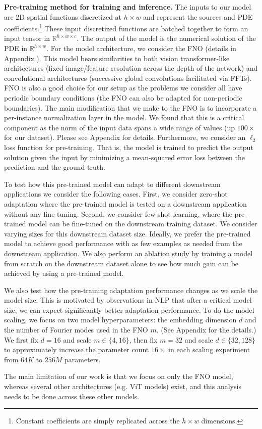 \medskip
\noindent \textbf{Pre-training method for training and inference.}
The inputs to our model are 2D spatial functions discretized at $h \times w$ and represent the sources and PDE coefficients.\footnote{Constant coefficients are simply replicated across the $h \times w$ dimensions.} 
These input discretized functions are batched together to form an input tensor in $\mathbb{R}^{h\times w\times c}$. The output of the model is the numerical solution of the PDE in $\mathbb{R}^{h\times w}$. 
%
For the model architecture, we consider the FNO (details in Appendix ). 
This model bears similarities to both vision transformer-like architectures (fixed image/feature resolution across the depth of the network) and convolutional architectures (successive global convolutions facilitated via FFTs).
FNO is also a good choice for our setup as the problems we consider all have periodic boundary conditions (the FNO can also be adapted for non-periodic boundaries). 
The main modification that we make to the FNO is to incorporate a per-instance normalization layer in the model. 
We found that this is a critical component as the norm of the input data spans a wide range of values (up $100\times$ for our dataset). 
Please see Appendix  for details.
%
Furthermore, we consider an $\ell_2$ loss function for pre-training. 
That is, the model is trained to predict the output solution given the input by minimizing a mean-squared error loss between the prediction and the ground truth.

To test how this pre-trained model can adapt to different downstream applications we consider the following cases. 
First,
we consider zero-shot adaptation where the pre-trained model is tested on a downstream application without any fine-tuning. 
Second, we consider few-shot learning, where the pre-trained model can be fine-tuned on the downstream training dataset. 
We consider varying sizes for this downstream dataset size. 
Ideally, we prefer the pre-trained model to achieve good performance with as few examples as needed from the downstream application. 
We also perform an ablation study by training a model from scratch on the downstream dataset alone to see how much gain can be achieved by using a pre-trained model.

We also test how the pre-training adaptation performance changes as we scale the model size. 
This is motivated by observations in NLP that after a critical model size, we can expect significantly better adaptation performance. To do the model scaling,
we focus on two model hyperparameters: the embedding dimension $d$ and the number of Fourier modes used in the FNO $m$. 
(See Appendix  for the details.) 
We first fix $d =
16$ and scale $m \in \{4, 16\}$, then fix $m = 32$ and scale $d \in \{32, 128\}$
to approximately increase the parameter count $16\times$ in each scaling experiment from $64K$ to $256M$ parameters. 

The main limitation of our work is that we focus on only the FNO model, whereas several other architectures (e.g. ViT models) exist, and this analysis needs to be done across these other models. 
